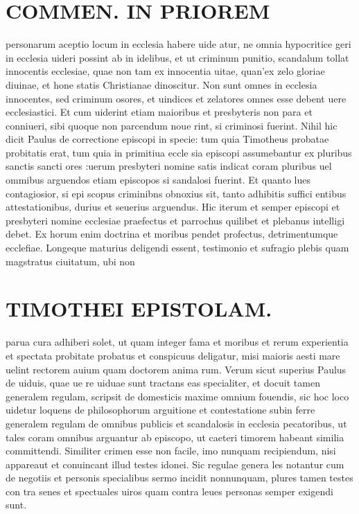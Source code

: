 \documentclass{article}
\begin{document}
\begin{pages}
\section*{COMMEN. IN PRIOREM }
\marginpar{[ p.144 ]}\pstart personarum aceptio locum in ecclesia habere uide atur, ne omnia hypocritice geri in ecclesia uideri possint ab in idelibus, et ut criminum punitio, scandalum tollat innocentis ecclesiae, quae non tam ex innocentia uitae, quan'ex zelo gloriae diuinae, et hone statis Christianae dinoscitur. Non sunt omnes in ecclesia innocentes, sed criminum osores, et uindices et zelatores omnes esse debent uere ecclesiastici. Et cum uiderint etiam maioribus et presbyteris non para et conniueri, sibi quoque non parcendum noue rint, si criminosi fuerint. Nihil hic dicit Paulus de correctione episcopi in specie: tum quia Timotheus probatae probitatis erat, tum quia in primitiua eccle sia episcopi assumebantur ex pluribus sanctis sancti ores :uerum presbyteri nomine satis indicat coram pluribus uel ommibus arguendos etiam episcopos si sandalosi fuerint. Et quanto lues contagiosior, si epi scopus criminibns obnoxius sit, tanto adhibitis suffici entibus attestationibus, durius et seuerius arguendus. Hic iterum et semper episcopi et presbyteri nomine ecclesiae praefectus et parrochus quilibet et plebanus intelligi debet. Ex horum enim doctrina et moribus pendet profectus, detrimentumque ecclefiae. Longeque maturius deligendi essent, testimonio et sufragio plebis quam magstratus ciuitatum, ubi non  \pend
\section*{TIMOTHEI EPISTOLAM. }
\marginpar{[ p.145 ]}\pstart parua cura adhiberi solet, ut quam integer fama et moribus et rerum experientia et spectata probitate probatus et conspicuus deligatur, misi maioris aesti mare uelint rectorem auium quam doctorem anima rum. Verum sicut superius Paulus de uiduis, quae ue re uiduae sunt tractans eas specialiter, et docuit tamen generalem regulam, scripsit de domesticis maxime omnium fouendis, sic hoc loco uidetur loquens de philosophorum arguitione et contestatione subin ferre generalem regulam de omnibus publicis et scandalosis in ecclesia pecatoribus, ut tales coram omnibus arguantur ab episcopo, ut caeteri timorem habeant similia committendi. Similiter crimen esse non facile, imo nunquam recipiendum, nisi appareaut et conuincant illud testes idonei. Sic regulae genera les notantur cum de negotiis et personis specialibus sermo incidit nonnunquam, plures tamen testes con tra senes et spectuales uiros quam contra leues personas semper exigendi sunt.  \pend
{}
{}

\end{pages}
\end{document}
